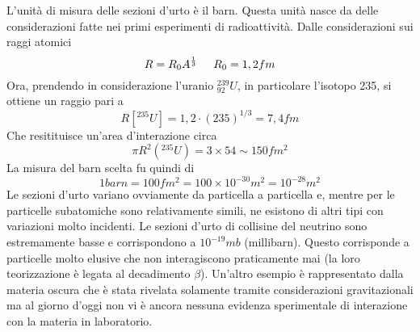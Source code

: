 L'unità di misura delle sezioni d'urto è il barn. 
Questa unità nasce da delle considerazioni fatte nei primi esperimenti di radioattività.
Dalle considerazioni sui raggi atomici 
\begin{equation}
R=R_0A^{\frac{1}{3}} \hspace{0.5cm} R_0=1,2fm
\end{equation}
Ora, prendendo in considerazione l'uranio $^{239}_{92}U$, in particolare l'isotopo 235, si ottiene un raggio pari a 
\[
R[^{235}U]=1,2\cdot (235)^{1/3}=7,4fm
\]
Che resitituisce un'area d'interazione circa
\[
\pi R^2(^{235}U)=3\times54\sim 150fm^2
\]
La misura del barn scelta fu quindi di
\begin{equation}
1barn=100fm^2=100\times 10^{-30}m^2=10^{-28}m^2
\end{equation}
Le sezioni d'urto variano ovviamente da particella a particella e, mentre per le particelle subatomiche sono relativamente simili, ne esistono di altri tipi con variazioni molto incidenti.
Le sezioni d'urto di collisine del neutrino sono estremamente basse e corrispondono a $10^{-19}mb$ (millibarn).
Questo corrisponde a particelle molto elusive che non interagiscono praticamente mai (la loro teorizzazione è legata al decadimento $\beta$).
Un'altro esempio è rappresentato dalla materia oscura che è stata rivelata solamente tramite considerazioni gravitazionali ma al giorno d'oggi non vi è ancora nessuna evidenza sperimentale di interazione con la materia in laboratorio.
